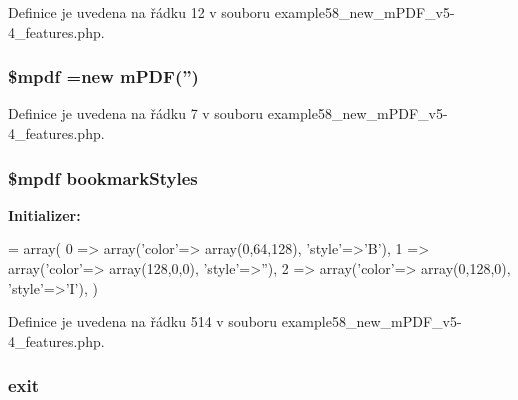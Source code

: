 Definice je uvedena na řádku 12 v souboru example58\-\_\-new\-\_\-m\-P\-D\-F\-\_\-v5-\/4\-\_\-features.\-php.

\hypertarget{example58__new__m_p_d_f__v5-4__features_8php_ad028f81910d6cbab9b184d2214b3a8f8}{
\subsubsection[{\$mpdf}]{\setlength{\rightskip}{0pt plus 5cm}\$mpdf =new {\bf m\-P\-D\-F}('')}}\label{example58__new__m_p_d_f__v5-4__features_8php_ad028f81910d6cbab9b184d2214b3a8f8}


Definice je uvedena na řádku 7 v souboru example58\-\_\-new\-\_\-m\-P\-D\-F\-\_\-v5-\/4\-\_\-features.\-php.

\hypertarget{example58__new__m_p_d_f__v5-4__features_8php_aba1207356788956789ec9373eed734f4}{
\subsubsection[{bookmark\-Styles}]{\setlength{\rightskip}{0pt plus 5cm}\$mpdf bookmark\-Styles}}\label{example58__new__m_p_d_f__v5-4__features_8php_aba1207356788956789ec9373eed734f4}
{\bfseries Initializer\-:}
\begin{DoxyCode}
= array(
    0 => array(\textcolor{stringliteral}{'color'}=> array(0,64,128), \textcolor{stringliteral}{'style'}=>\textcolor{charliteral}{'B'}),
    1 => array(\textcolor{stringliteral}{'color'}=> array(128,0,0), \textcolor{stringliteral}{'style'}=>\textcolor{stringliteral}{''}),
    2 => array(\textcolor{stringliteral}{'color'}=> array(0,128,0), \textcolor{stringliteral}{'style'}=>\textcolor{charliteral}{'I'}),
)
\end{DoxyCode}


Definice je uvedena na řádku 514 v souboru example58\-\_\-new\-\_\-m\-P\-D\-F\-\_\-v5-\/4\-\_\-features.\-php.

\hypertarget{example58__new__m_p_d_f__v5-4__features_8php_a6733eb5f605d09eaede9845835d71c4e}{
\subsubsection[{exit}]{\setlength{\rightskip}{0pt plus 5cm}exit}}\label{example58__new__m_p_d_f__v5-4__features_8php_a6733eb5f605d09eaede9845835d71c4e}


